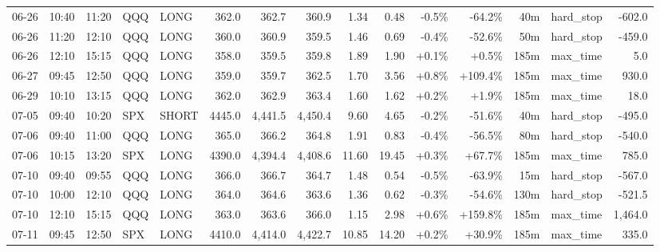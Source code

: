 \documentclass[11pt,a4paper,twoside]{article}
\begin{document}
\begin{landscape}
\begin{center}
\begin{longtable}{>{\color{txtmain}}l l l l l r r r r r r r r >{\color{txtmain}}l r}
06-26 & 10:40 & 11:20 & QQQ & LONG & 362.0 & 362.7 & 360.9 & 1.34 & 0.48 & \textcolor{lossred}{-0.5\%} & \textcolor{lossred}{-64.2\%} & 40m & hard\_stop & \textcolor{lossred}{-602.0} \\
06-26 & 11:20 & 12:10 & QQQ & LONG & 360.0 & 360.9 & 359.5 & 1.46 & 0.69 & \textcolor{lossred}{-0.4\%} & \textcolor{lossred}{-52.6\%} & 50m & hard\_stop & \textcolor{lossred}{-459.0} \\
06-26 & 12:10 & 15:15 & QQQ & LONG & 358.0 & 359.5 & 359.8 & 1.89 & 1.90 & \textcolor{wingreen}{+0.1\%} & \textcolor{wingreen}{+0.5\%} & 185m & max\_time & \textcolor{wingreen}{5.0} \\
06-27 & 09:45 & 12:50 & QQQ & LONG & 359.0 & 359.7 & 362.5 & 1.70 & 3.56 & \textcolor{wingreen}{+0.8\%} & \textcolor{wingreen}{+109.4\%} & 185m & max\_time & \textcolor{wingreen}{930.0} \\
06-29 & 10:10 & 13:15 & QQQ & LONG & 362.0 & 362.9 & 363.4 & 1.60 & 1.62 & \textcolor{wingreen}{+0.2\%} & \textcolor{wingreen}{+1.9\%} & 185m & max\_time & \textcolor{wingreen}{18.0} \\
07-05 & 09:40 & 10:20 & SPX & SHORT & 4445.0 & 4,441.5 & 4,450.4 & 9.60 & 4.65 & \textcolor{lossred}{-0.2\%} & \textcolor{lossred}{-51.6\%} & 40m & hard\_stop & \textcolor{lossred}{-495.0} \\
07-06 & 09:40 & 11:00 & QQQ & LONG & 365.0 & 366.2 & 364.8 & 1.91 & 0.83 & \textcolor{lossred}{-0.4\%} & \textcolor{lossred}{-56.5\%} & 80m & hard\_stop & \textcolor{lossred}{-540.0} \\
07-06 & 10:15 & 13:20 & SPX & LONG & 4390.0 & 4,394.4 & 4,408.6 & 11.60 & 19.45 & \textcolor{wingreen}{+0.3\%} & \textcolor{wingreen}{+67.7\%} & 185m & max\_time & \textcolor{wingreen}{785.0} \\
07-10 & 09:40 & 09:55 & QQQ & LONG & 366.0 & 366.7 & 364.7 & 1.48 & 0.54 & \textcolor{lossred}{-0.5\%} & \textcolor{lossred}{-63.9\%} & 15m & hard\_stop & \textcolor{lossred}{-567.0} \\
07-10 & 10:00 & 12:10 & QQQ & LONG & 364.0 & 364.6 & 363.6 & 1.36 & 0.62 & \textcolor{lossred}{-0.3\%} & \textcolor{lossred}{-54.6\%} & 130m & hard\_stop & \textcolor{lossred}{-521.5} \\
07-10 & 12:10 & 15:15 & QQQ & LONG & 363.0 & 363.6 & 366.0 & 1.15 & 2.98 & \textcolor{wingreen}{+0.6\%} & \textcolor{wingreen}{+159.8\%} & 185m & max\_time & \textcolor{wingreen}{1,464.0} \\
07-11 & 09:45 & 12:50 & SPX & LONG & 4410.0 & 4,414.0 & 4,422.7 & 10.85 & 14.20 & \textcolor{wingreen}{+0.2\%} & \textcolor{wingreen}{+30.9\%} & 185m & max\_time & \textcolor{wingreen}{335.0} \\

\end{longtable}
\end{center}
\end{landscape}
\end{document}
